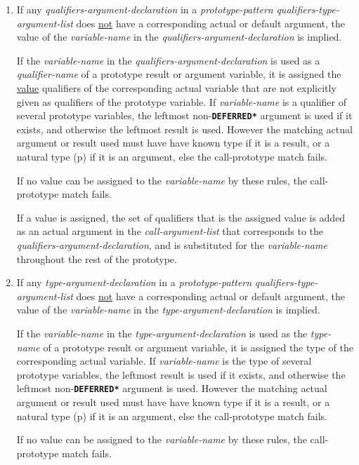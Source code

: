 \documentclass[12pt]{article}
\newcommand{\TT}[1]{{\tt \bfseries #1}}
\newcommand{\pagref}[1]{p\pageref{#1}}
\begin{document}
\begin{enumerate}
\item
If any {\em qualifiers-argument-declaration} in a {\em prototype-pattern}
{\em qualifiers-type-argument-list} does \underline{not} have
a corresponding actual or default argument, the value of the
{\em variable-name} in the {\em qual\-i\-fiers-argument-declaration}
is implied.

If the {\em variable-name} in the {\em qualifiers-argument-declaration}
is used as a {\em qualifier-name} of a prototype result or argument variable,
it is assigned the \underline{value} qualifiers of the
corresponding actual variable that are not explicitly given as qualifiers
of the prototype variable.  If {\em variable-name}
is a qualifier of several prototype
variables, the leftmost non-\TT{*DEFERRED*}
argument is used if it exists, and otherwise
the leftmost result is used.
However the matching actual argument or result used must have
have known type if it is a result, or a
natural type (\pagref{NATURAL-TYPE}) if it is an argument,
else the call-prototype match fails.

If no value can be assigned to the {\em variable-name} by these rules,
the call-prototype match fails.

If a value is assigned,
the set of qualifiers that is the assigned value
is added as an actual argument
in the {\em call-argument-list} that corresponds
to the {\em qualifiers-argument-declaration}, and
is substituted for the {\em variable-name} throughout the rest of the
prototype.

\item
If any {\em type-argument-declaration} in a {\em prototype-pattern}
{\em qualifiers-type-argument-list} does \underline{not} have
a corresponding actual or default argument, the value of the
{\em variable-name} in the {\em type-argument-declaration}
is implied.

If the {\em variable-name} in the {\em type-argument-declaration}
is used as the {\em type-name} of a prototype result or argument variable,
it is assigned the type of the corresponding actual variable.
If {\em variable-name} is the type of several prototype
variables, the leftmost result is used if it exists, and otherwise
the leftmost non-\TT{*DEFERRED*} argument is used.
However the matching actual argument or result used must have
have known type if it is a result, or a
natural type (\pagref{NATURAL-TYPE}) if it is an argument,
else the call-prototype match fails.

If no value can be assigned to the {\em variable-name} by these rules,
the call-prototype match fails.


\end{enumerate}
\end{document}
